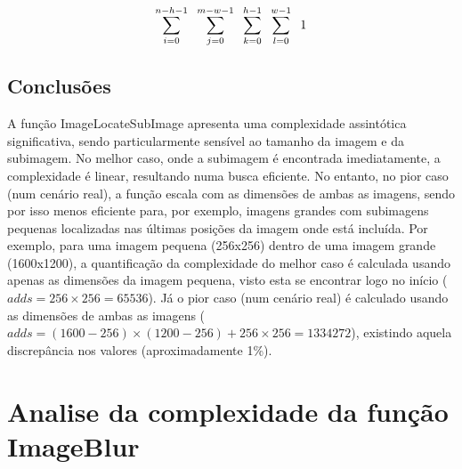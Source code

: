 \documentclass{report}
\begin{document}
\begin{equation}
     \sum_{i=0}^{n-h-1}  \hspace{2mm} \sum_{j=0}^{m-w-1}  \hspace{2mm} \sum_{k=0}^{h-1} \hspace{2mm}  \sum_{l=0}^{w-1} \hspace{2mm} 1 \notag
\end{equation}


\subsection{Conclusões}

A função ImageLocateSubImage apresenta uma complexidade assintótica significativa, sendo particularmente sensível ao tamanho da imagem e da subimagem. No melhor caso, onde a subimagem é encontrada imediatamente, a complexidade é linear, resultando numa busca eficiente. No entanto, no pior caso (num cenário real), a função escala com as dimensões de ambas as imagens, sendo por isso menos eficiente para, por exemplo, imagens grandes com subimagens pequenas localizadas nas últimas posições da imagem onde está incluída. Por exemplo, para uma imagem pequena (256x256) dentro de uma imagem grande (1600x1200), a quantificação da complexidade do melhor caso é calculada usando apenas as dimensões da imagem pequena, visto esta se encontrar logo no início (  \texttt{$adds = 256\times256 = 65536$}). Já o pior caso (num cenário real) é calculado usando as dimensões de ambas as imagens (\texttt{$adds = (1600-256) \times (1200-256) + 256 \times 256 = 1334272 $}), existindo aquela discrepância nos valores (aproximadamente 1\%).


\newpage


\section{Analise da complexidade da função ImageBlur}
\end{document}
